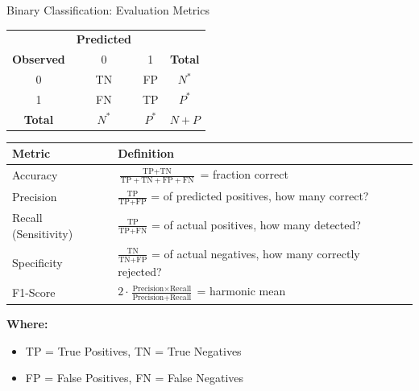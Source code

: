 \documentclass[11pt]{beamer}
\begin{document}
\begin{frame}{Binary Classification: Evaluation Metrics}
    \begin{center}
		\scriptsize
        \begin{tabular}{c|c|c|c}
            & \textbf{Predicted} & & \\
            \textbf{Observed} & 0 & 1 & \textbf{Total} \\
            \hline
            0 & TN & FP & $N^\ast$ \\
            \hline
            1 & FN & TP & $P^\ast$ \\
            \hline
            \textbf{Total} & $N^\ast$ & $P^\ast$ & $N + P$ \\
            \hline
        \end{tabular}
    \end{center}

    \vspace{0.2cm}
    \begin{table}
        \scriptsize
        \begin{tabular}{|l|l|}
            \hline
            \textbf{Metric}      & \textbf{Definition}                                                                                      \\
            \hline
            Accuracy             & $\frac{\text{TP} + \text{TN}}{\text{TP} + \text{TN} + \text{FP} + \text{FN}}$ = fraction correct         \\
            \hline
            Precision            & $\frac{\text{TP}}{\text{TP} + \text{FP}}$ = of predicted positives, how many correct?                    \\
            \hline
            Recall (Sensitivity) & $\frac{\text{TP}}{\text{TP} + \text{FN}}$ = of actual positives, how many detected?                      \\
            \hline
            Specificity          & $\frac{\text{TN}}{\text{TN} + \text{FP}}$ = of actual negatives, how many correctly rejected?            \\
            \hline
            F1-Score             & $2 \cdot \frac{\text{Precision} \times \text{Recall}}{\text{Precision} + \text{Recall}}$ = harmonic mean \\
            \hline
        \end{tabular}
    \end{table}

    \vspace{0.1cm}
    \textbf{Where:}
    \begin{itemize}
        \item TP = True Positives, TN = True Negatives
        \item FP = False Positives, FN = False Negatives
    \end{itemize}


\end{frame}
\end{document}
